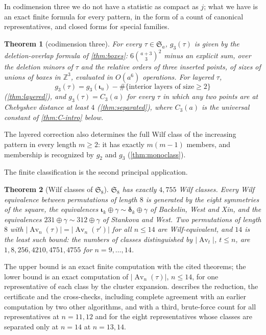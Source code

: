 \documentclass[11pt,reqno]{amsart}
\theoremstyle{plain}
\newtheorem{theorem}{Theorem}[section]
\theoremstyle{definition}
\theoremstyle{remark}
\newcommand{\Av}{\operatorname{Av}}
\let\greekiota\iota
\renewcommand{\iota}{\boldsymbol{\greekiota}}
\newcommand{\dd}{\boldsymbol{\delta}}
\newcommand{\Sym}{\mathfrak{S}}
\newcommand{\ZZ}{\mathbb{Z}}
\begin{document}
In codimension three we do not have a statistic as compact as $j$; what we have is an exact finite formula for every pattern, in the form of a count of canonical representatives, and closed forms for special families.

\begin{theorem}[codimension three]\label{thm:G-intro}
For every $\tau\in\Sym_a$, $g_3(\tau)$ is given by the deletion-overlap formula of \cref{thm:boxes}: $6\binom{a+3}3^2$ minus an explicit sum, over the deletion minors of $\tau$ and the relative orders of three inserted points, of sizes of unions of boxes in $\ZZ^3$, evaluated in $O(a^6)$ operations. For layered $\tau$,
\[
g_3(\tau)=g_3(\iota_a)-\#\{\text{interior layers of size}\ge2\}
\]
(\cref{thm:layered}), and $g_3(\tau)=C_3(a)$ for every $\tau$ in which any two points are at Chebyshev distance at least $4$ (\cref{thm:separated}), where $C_3(a)$ is the universal constant of \cref{thm:C-intro} below.
\end{theorem}


The layered correction also determines the full Wilf class of the
increasing pattern in every length $m\ge2$: it has exactly $m(m-1)$
members, and membership is recognized by $g_2$ and $g_3$
(\cref{thm:monoclass}).

The finite classification is the second principal application.

\begin{theorem}[Wilf classes of $\Sym_8$]\label{thm:E-intro}
$\Sym_8$ has exactly $4{,}755$ Wilf classes. Every Wilf equivalence between permutations of length $8$ is generated by the eight symmetries of the square, the equivalences $\iota_k\oplus\gamma\sim\dd_k\oplus\gamma$ of Backelin, West and Xin, and the equivalences $231\oplus\gamma\sim312\oplus\gamma$ of Stankova and West. Two permutations of length $8$ with $|\Av_n(\tau)|=|\Av_n(\tau')|$ for all $n\le14$ are Wilf-equivalent, and $14$ is the least such bound: the numbers of classes distinguished by $|\Av_t|$, $t\le n$, are $1,8,256,4210,4751,4755$ for $n=9,\dots,14$.
\end{theorem}

The upper bound is an exact finite computation with the cited theorems; the lower bound is an exact computation of $|\Av_n(\tau)|$, $n\le14$, for one representative of each class by the cluster expansion.  describes the reduction, the certificate and the cross-checks, including complete agreement with an earlier computation by two other algorithms, and with a third, brute-force count for all representatives at $n=11,12$ and for the eight representatives whose classes are separated only at $n=14$ at $n=13,14$.
\end{document}
